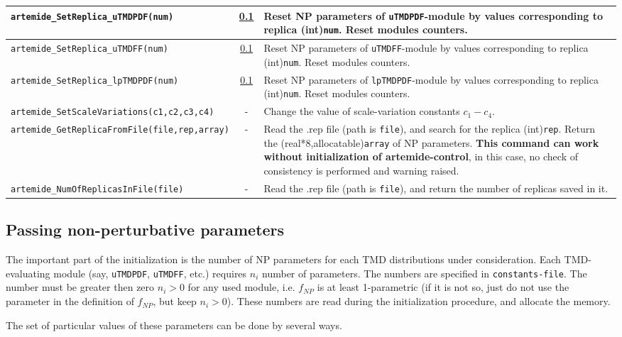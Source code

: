 \documentclass[prd,nofootinbib,eqsecnum,final]{revtex4}
\renewcommand{\(}{\left(}
\renewcommand{\)}{\right)}
\renewcommand{\[}{\left[}
\renewcommand{\]}{\right]}
\begin{document}
\begin{center}
\begin{longtable}{||p{7cm}|c|p{10cm}||}
\\\hline
\texttt{artemide\_SetReplica\_uTMDPDF(num)} &\ref{control:NPparam} & Reset NP parameters of \texttt{uTMDPDF}-module by values corresponding to replica (int)\texttt{num}. Reset modules counters.
\\\hline
\texttt{artemide\_SetReplica\_uTMDFF(num)} &\ref{control:NPparam} & Reset NP parameters of \texttt{uTMDFF}-module by values corresponding to replica (int)\texttt{num}. Reset modules counters.
\\\hline
\texttt{artemide\_SetReplica\_lpTMDPDF(num)} &\ref{control:NPparam} & Reset NP parameters of \texttt{lpTMDPDF}-module by values corresponding to replica (int)\texttt{num}. Reset modules counters.
\\\hline
\texttt{artemide\_SetScaleVariations(c1,c2,c3,c4)} & - & Change the value of scale-variation constants $c_1-c_4$.
\\\hline\hline
\texttt{artemide\_GetReplicaFromFile(file,rep,array)} & - & Read the .rep file (path is \texttt{file}), and search for the replica (int)\texttt{rep}. Return the (real*8,allocatable)\texttt{array} of NP parameters. \textbf{This command can work without initialization of artemide-control}, in this case, no check of consistency is performed and warning raised.
\\\hline
\texttt{artemide\_NumOfReplicasInFile(file)} & - & Read the .rep file (path is \texttt{file}), and return the number of replicas saved in it.
\end{longtable}
\end{center}

\subsection{Passing non-perturbative parameters}
\label{control:NPparam}

The important part of the initialization is the number of NP parameters for each TMD distributions under consideration. Each TMD-evaluating module (say, \texttt{uTMDPDF}, \texttt{uTMDFF}, etc.) requires $n_i$ number of parameters. The numbers are specified in \texttt{constants-file}. The number must be greater then zero $n_i>0$ for any used module, i.e. $f_{NP}$ is at least 1-parametric (if it is not so, just do not use the parameter in the definition of $f_{NP}$, but keep $n_i>0$). These numbers are read during the initialization procedure, and allocate the memory. 

The set of particular values of these parameters can be done by several ways.
\end{document}
